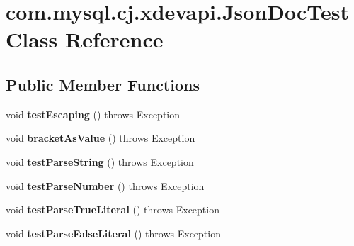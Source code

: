 \hypertarget{classcom_1_1mysql_1_1cj_1_1xdevapi_1_1_json_doc_test}{}\section{com.\+mysql.\+cj.\+xdevapi.\+Json\+Doc\+Test Class Reference}
\label{classcom_1_1mysql_1_1cj_1_1xdevapi_1_1_json_doc_test}
\subsection*{Public Member Functions}
\begin{DoxyCompactItemize}
\item 
\mbox{\label{classcom_1_1mysql_1_1cj_1_1xdevapi_1_1_json_doc_test_a80c9a9c3c580286db8942e14a3289ea6}} 
void {\bfseries test\+Escaping} ()  throws Exception 
\item 
\mbox{\label{classcom_1_1mysql_1_1cj_1_1xdevapi_1_1_json_doc_test_aaaee87e4d8779e5ee7c3d912937c0a10}} 
void {\bfseries bracket\+As\+Value} ()  throws Exception 
\item 
\mbox{\label{classcom_1_1mysql_1_1cj_1_1xdevapi_1_1_json_doc_test_a365f8ab04f49020d167fec1692022e09}} 
void {\bfseries test\+Parse\+String} ()  throws Exception 
\item 
\mbox{\label{classcom_1_1mysql_1_1cj_1_1xdevapi_1_1_json_doc_test_a00569222edca49b60a1b46ac32b719e1}} 
void {\bfseries test\+Parse\+Number} ()  throws Exception 
\item 
\mbox{\label{classcom_1_1mysql_1_1cj_1_1xdevapi_1_1_json_doc_test_a6993d0a21e6200e5d818760a6a84892c}} 
void {\bfseries test\+Parse\+True\+Literal} ()  throws Exception 
\item 
\mbox{\label{classcom_1_1mysql_1_1cj_1_1xdevapi_1_1_json_doc_test_a7dc31b36126ef7e19248c5c243bc0a6c}} 
void {\bfseries test\+Parse\+False\+Literal} ()  throws Exception 
\item 

\end{DoxyCompactItemize}
